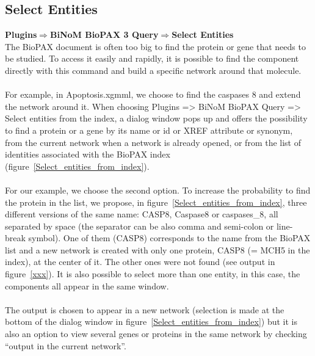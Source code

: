 \subsection{Select Entities}
\textbf{Plugins$\Rightarrow$BiNoM BioPAX 3 Query$\Rightarrow$Select Entities}\\
The BioPAX document is often too big to find the protein or gene that needs to be studied. To access it easily and rapidly, it is possible to find the component directly with this command and build a specific network around that molecule.\\\\
For example, in Apoptosis.xgmml, we choose to find the caspases 8 and extend the network around it. When choosing Plugins => BiNoM BioPAX Query => Select entities from the index, a dialog window pops up and offers the possibility to find a protein or a gene by its name or id or XREF attribute or synonym, from the current network when a network is already opened, or from the list of identities associated with the BioPAX index (figure~\ref{Select_entities_from_index}).\\\\
For our example, we choose the second option. To increase the probability to find the protein in the list, we propose, in figure~\ref{Select_entities_from_index}, three different versions of the same name: CASP8, Caspase8 or caspases\_8, all separated by space (the separator can be also comma and semi-colon or line-break symbol). One of them (CASP8) corresponds to the name from the BioPAX list and a new network is created with only one protein, CASP8 (= MCH5 in the index), at the center of it. The other ones were not found (see output in figure~\ref{xxx}). It is also possible to select more than one entity, in this case, the components all appear in the same window.\\\\
The output is chosen to appear in a new network (selection is made at the bottom of the dialog window in figure~\ref{Select_entities_from_index}) but it is also an option to view several genes or proteins in the same network by checking “output in the current network”.\\\\
